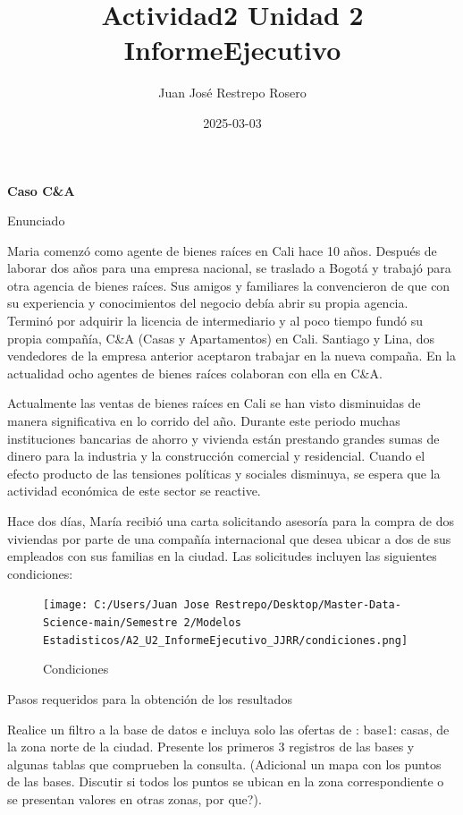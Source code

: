 \documentclass[
]{article}
\title{Actividad2 Unidad 2 InformeEjecutivo}
\author{Juan José Restrepo Rosero}
\date{2025-03-03}
\begin{document}
\maketitle

{
\setcounter{tocdepth}{2}
\tableofcontents
}
\textbf{Caso C\&A}

Enunciado

Maria comenzó como agente de bienes raíces en Cali hace 10 años. Después
de laborar dos años para una empresa nacional, se traslado a Bogotá y
trabajó para otra agencia de bienes raíces. Sus amigos y familiares la
convencieron de que con su experiencia y conocimientos del negocio debía
abrir su propia agencia. Terminó por adquirir la licencia de
intermediario y al poco tiempo fundó su propia compañía, C\&A (Casas y
Apartamentos) en Cali. Santiago y Lina, dos vendedores de la empresa
anterior aceptaron trabajar en la nueva compaña. En la actualidad ocho
agentes de bienes raíces colaboran con ella en C\&A.

Actualmente las ventas de bienes raíces en Cali se han visto disminuidas
de manera significativa en lo corrido del año. Durante este periodo
muchas instituciones bancarias de ahorro y vivienda están prestando
grandes sumas de dinero para la industria y la construcción comercial y
residencial. Cuando el efecto producto de las tensiones políticas y
sociales disminuya, se espera que la actividad económica de este sector
se reactive.

Hace dos días, María recibió una carta solicitando asesoría para la
compra de dos viviendas por parte de una compañía internacional que
desea ubicar a dos de sus empleados con sus familias en la ciudad. Las
solicitudes incluyen las siguientes condiciones:

\begin{figure}
\centering
\texttt{[image: C:/Users/Juan Jose Restrepo/Desktop/Master-Data-Science-main/Semestre 2/Modelos Estadisticos/A2\_U2\_InformeEjecutivo\_JJRR/condiciones.png]}
\caption{Condiciones}
\end{figure}

Pasos requeridos para la obtención de los resultados

Realice un filtro a la base de datos e incluya solo las ofertas de :
base1: casas, de la zona norte de la ciudad. Presente los primeros 3
registros de las bases y algunas tablas que comprueben la consulta.
(Adicional un mapa con los puntos de las bases. Discutir si todos los
puntos se ubican en la zona correspondiente o se presentan valores en
otras zonas, por que?).
\end{document}
